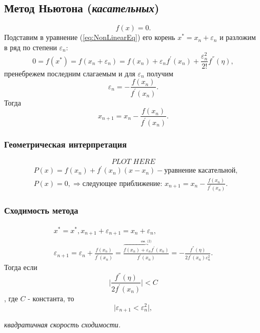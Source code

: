 \documentclass[a4paper,11pt]{article}
\begin{document}
\subsection{Метод Ньютона (\textit{касательных})}
\begin{equation}
  f(x) = 0.
  \label{eq:NonlinearEq}
\end{equation}
Подставим в уравнение (\ref{eq:NonLinearEq}) его корень $x^*=x_n+\varepsilon_n$ и разложим \\ в ряд по степени $\varepsilon_n$:
\begin{equation}
  0 = f(x^*) = f(x_n+\varepsilon_n) = f(x_n)+\varepsilon_nf^{'}(x_n)+\frac{\varepsilon_n^2}{2!}f^{''}(\eta),
\end{equation}
пренебрежем последним слагаемым и для $\varepsilon_n$ получим
\begin{equation*}
  \varepsilon_n = - \frac{f(x_n)}{f^{'}(x_n)}.
\end{equation*}
Тогда
\begin{equation}
  x_{n+1} = x_n - \frac{f(x_n)}{f^{'}(x_n)}.
\end{equation}

\subsubsection{Геометрическая интерпретация}
\begin{equation*}
  \textit{PLOT HERE}
\end{equation*}
\begin{align*}
  &P(x) = f(x_n) + f^{'}(x_n)(x-x_n) - \text{уравнение касательной}, \\
  &P(x) = 0, \Rightarrow \text{следующее приближение: } x_{n+1} = x_n - \frac{f(x_n)}{f^{'}(x_n)}.
\end{align*}

\subsubsection{Сходимость метода}
\begin{gather*}
  x^* = x^*, x_{n+1}+\varepsilon_{n+1} = x_n+\varepsilon_n, \\
  \varepsilon_{n+1} = \varepsilon_n + \frac{f(x_n)}{f^{'}(x_n)} = \frac{\overbrace{f(x_n) + \varepsilon_nf^{'}(x_n)}^{\text{см. ($2$)}}}{f^{'}(x_n)} =
  -\frac{f^{''}(\eta)}{2f^{'}(x_n)\varepsilon_n^2}.
\end{gather*}
Тогда если \[\bigg| \frac{f^{''}(\eta)}{2f^{'}(x_n)} \bigg| < C\], где $C$ - константа, то
\begin{equation}
  \bigg| \varepsilon_{n+1} < \varepsilon_n^2 \bigg|,
\end{equation}
\begin{center}
  \small \textit{квадратичная скорость сходимости.}
\end{center}
\end{document}
